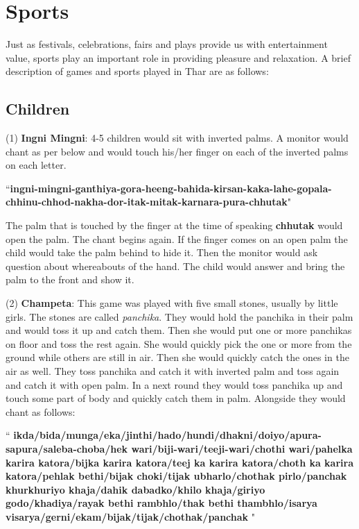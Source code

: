 \chapter{Sports}
Just as festivals, celebrations, fairs and plays provide us with entertainment value, sports play an important role in providing pleasure and relaxation. A brief description of games and sports played in Thar are as follows:

\section{Children}

(1) \textbf{Ingni Mingni}: 4-5 children would sit with inverted palms. A monitor would chant as per below and would touch his/her finger on each of the inverted palms on each letter.

``\textbf{ingni-mingni-ganthiya-gora-heeng-bahida-kirsan-kaka-lahe-gopala-chhinu-chhod-nakha-dor-itak-mitak-karnara-pura-chhutak}"

The palm that is touched by the finger at the time of speaking \textbf{chhutak} would open the palm. The chant begins again. If the finger comes on an open palm the child would take the palm behind to hide it. Then the monitor would ask question about whereabouts of the hand. The child would answer and bring the palm to the front and show it.

(2) \textbf{Champeta}: This game was played with five small stones, usually by little girls. The stones are called \textit{panchika}. They would hold the panchika in their palm and would toss it up and catch them. Then she would put one or more panchikas on floor and toss the rest again. She would quickly pick the one or more from the ground while others are still in air. Then she would quickly catch the ones in the air as well. They toss panchika and catch it with inverted palm and toss again and catch it with open palm. In a next round they would toss panchika up and touch some part of body and quickly catch them in palm. Alongside they would chant as follows:

``\textbf{
    ikda/bida/munga/eka/jinthi/hado/hundi/dhakni/doiyo/apura-sapura/saleba-choba/hek wari/biji-wari/teeji-wari/chothi wari/pahelka karira katora/bijka karira katora/teej ka karira katora/choth ka karira katora/pehlak bethi/bijak choki/tijak ubharlo/chothak pirlo/panchak khurkhuriyo khaja/dahik dabadko/khilo khaja/giriyo godo/khadiya/rayak bethi rambhlo/thak bethi thambhlo/isarya visarya/gerni/ekam/bijak/tijak/chothak/panchak
}"

